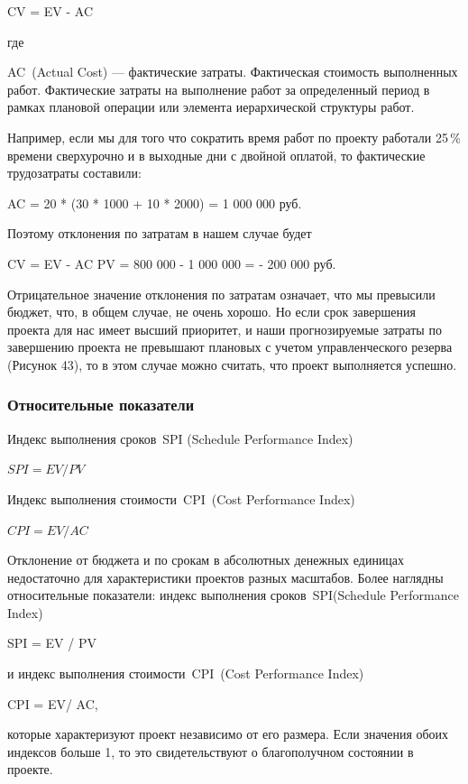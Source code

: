 \documentclass{../industrial-development}
\begin{document}
CV = EV - AC

где

AC (Actual Cost) — фактические затраты. Фактическая стоимость выполненных работ. Фактические затраты на выполнение работ за определенный период в рамках плановой операции или элемента иерархической структуры работ.

Например, если мы для того что сократить время работ по проекту работали 25\,\% времени сверхурочно и в выходные дни с двойной оплатой, то фактические трудозатраты составили:

AC = 20 * (30 * 1000 + 10 * 2000) = 1 000 000 руб.

Поэтому отклонения по затратам в нашем случае будет

CV = EV - AC PV = 800 000 - 1 000 000 = - 200 000 руб.

Отрицательное значение отклонения по затратам означает, что мы превысили бюджет, что, в общем случае, не очень хорошо. Но если срок завершения проекта для нас имеет высший приоритет, и наши прогнозируемые затраты по завершению проекта не превышают плановых с учетом управленческого резерва (Рисунок 43), то в этом случае можно считать, что проект выполняется успешно.

    \begin{frame} \frametitle{Относительные показатели}
        Индекс выполнения сроков \alert{SPI} (Schedule Performance Index)
        \begin{center}
            $SPI = EV / PV$
        \end{center}
        Индекс выполнения стоимости \alert{CPI} (Cost Performance Index)
        \begin{center}
            $CPI = EV / AC$
        \end{center}
    \end{frame}
    \lecturenotes 
Отклонение от бюджета и по срокам в абсолютных денежных единицах недостаточно для характеристики проектов разных масштабов. Более наглядны относительные показатели: индекс выполнения сроков SPI(Schedule Performance Index)

SPI = EV / PV

и индекс выполнения стоимости CPI (Cost Performance Index)

CPI = EV/ AC,

которые характеризуют проект независимо от его размера. Если значения обоих индексов больше 1, то это свидетельствуют о благополучном состоянии в проекте.
\end{document}

